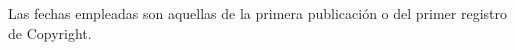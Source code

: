 \documentclass[11pt]{book}
\begin{document}


\appendix




\printnomenclature

\nocite{*}
\printbibheading[heading=bibintoc]
Las fechas empleadas son aquellas de la primera publicación o del primer registro de Copyright.
\bibbycategory

\printindex

\listoftodos
\end{document}
